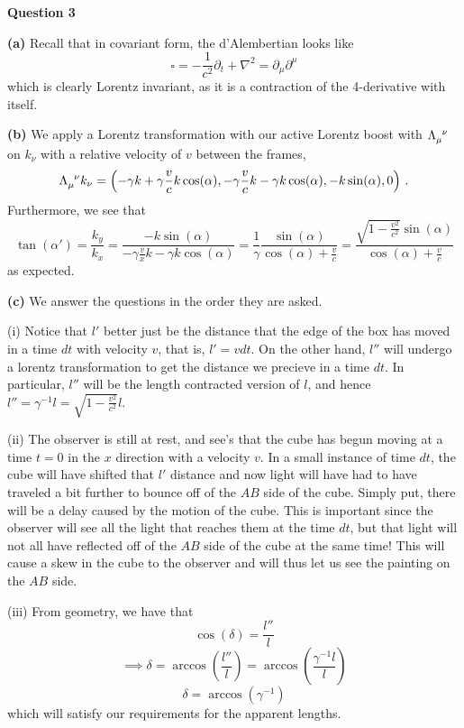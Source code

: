 \documentclass[10pt]{article}
\begin{document}
\newpage
\textbf{Question 3}

\textbf{(a)} Recall that in covariant form, the d'Alembertian looks like
\[ \square = -\frac{1}{c^{2}}\partial_{t} + \nabla^{2} = \partial_{\mu}\partial^{\mu} \]
which is clearly Lorentz invariant, as it is a contraction of the 4-derivative with itself. 

\textbf{(b)} We apply a Lorentz transformation with our active Lorentz boost with $\tensor{\Lambda}{_{\mu}^{\nu}}$ on $k_{\nu}$ with a relative velocity of $v$ between the frames,
\[ \tensor{\Lambda}{_{\mu}^{\nu}}k_{\nu} = \left(-\gamma k + \gamma \frac{v}{c}k\cos(\alpha), -\gamma\frac{v}{c}k -\gamma k \cos(\alpha), -k\sin(\alpha), 0\right) \, .\]
Furthermore, we see that
\[ \tan(\alpha') = \frac{k_{y}}{k_{x}} = \frac{-k\sin(\alpha)}{-\gamma\frac{v}{x}k - \gamma k\cos(\alpha)} = \frac{1}{\gamma}\frac{\sin(\alpha)}{\cos(\alpha) + \frac{v}{c}} = \frac{\sqrt{1 - \frac{v^{2}}{c^{2}}}\sin(\alpha)}{\cos(\alpha) + \frac{v}{c}}\]
as expected.

\textbf{(c)} We answer the questions in the order they are asked.

(i) Notice that $l'$ better just be the distance that the edge of the box has moved in a time $dt$ with velocity $v$, that is, $l' = vdt$. On the other hand, $l''$ will undergo a lorentz transformation to get the distance we precieve in a time $dt$. In particular, $l''$ will be the length contracted version of $l$, and hence $l'' = \gamma^{-1} l = \sqrt{1 - \frac{v^{2}}{c^{2}}}l$.

(ii) The observer is still at rest, and see's that the cube has begun moving at a time $t=0$ in the $x$ direction with a velocity $v$. In a small instance of time $dt$, the cube will have shifted that $l'$ distance and now light will have had to have traveled a bit further to bounce off of the $AB$ side of the cube. Simply put, there will be a delay caused by the motion of the cube. This is important since the observer will see all the light that reaches them at the time $dt$, but that light will not all have reflected off of the $AB$ side of the cube at the same time! This will cause a skew in the cube to the observer and will thus let us see the painting on the $AB$ side.

(iii) From geometry, we have that
\[ \cos(\delta) = \frac{l''}{l}\]
\[ \implies \delta = \arccos \left(\frac{l''}{l}\right) = \arccos \left(\frac{\gamma^{-1}l}{l}\right)\]
\[ \delta = \arccos(\gamma^{-1})\]
which will satisfy our requirements for the apparent lengths.
\end{document}
